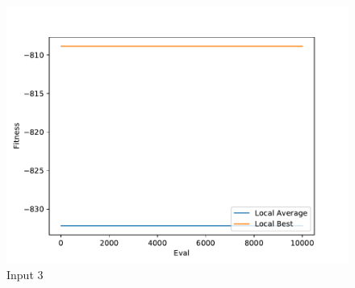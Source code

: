 \documentclass{standalone}
\begin{document}
\begin{figure}[!htb]
	\caption{Input 3}
	\label{fig:graph_3055}
	\includegraphics[width=\textwidth]{../graphs/graphs/3055.pdf}
\end{figure}
\end{document}
